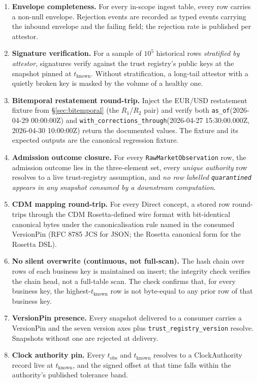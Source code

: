 \documentclass[11pt,a4paper]{article}
\newcounter{rul}
\begin{document}
\begin{enumerate}
\item \textbf{Envelope completeness.} For every in-scope ingest table, every row carries a non-null envelope. Rejection events are recorded as typed events carrying the inbound envelope and the failing field; the rejection rate is published per attestor.
\item \textbf{Signature verification.} For a sample of $10^5$ historical rows \emph{stratified by attestor}, signatures verify against the trust registry's public keys at the snapshot pinned at $t_{\text{known}}$. Without stratification, a long-tail attestor with a quietly broken key is masked by the volume of a healthy one.
\item \textbf{Bitemporal restatement round-trip.} Inject the EUR/USD restatement fixture from \S\ref{sec:bitemporal} (the $R_1$/$R_2$ pair) and verify both \texttt{as\_of}(2026-04-29 00:00:00Z) and \texttt{with\_corrections\_through}(2026-04-27 15:30:00.000Z, 2026-04-30 10:00:00Z) return the documented values. The fixture and its expected outputs are the canonical regression fixture.
\item \textbf{Admission outcome closure.} For every \texttt{RawMarketObservation} row, the admission outcome lies in the three-element set, every \emph{unique authority} row resolves to a live trust-registry assumption, and \emph{no row labelled \texttt{quarantined} appears in any snapshot consumed by a downstream computation}.
\item \textbf{CDM mapping round-trip.} For every Direct concept, a stored row round-trips through the CDM Rosetta-defined wire format with bit-identical canonical bytes under the canonicalisation rule named in the consumed VersionPin (RFC 8785 JCS for JSON; the Rosetta canonical form for the Rosetta DSL).
\item \textbf{No silent overwrite (continuous, not full-scan).} The hash chain over rows of each business key is maintained on insert; the integrity check verifies the chain head, not a full-table scan. The check confirms that, for every business key, the highest-$t_{\text{known}}$ row is not byte-equal to any prior row of that business key.
\item \textbf{VersionPin presence.} Every snapshot delivered to a consumer carries a VersionPin and the seven version axes plus \texttt{trust\_registry\_version} resolve. Snapshots without one are rejected at delivery.
\item \textbf{Clock authority pin.} Every $t_{\text{obs}}$ and $t_{\text{known}}$ resolves to a ClockAuthority record live at $t_{\text{known}}$, and the signed offset at that time falls within the authority's published tolerance band.
\end{enumerate}
\end{document}
